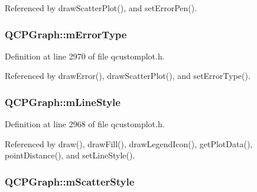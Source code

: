 Referenced by draw\+Scatter\+Plot(), and set\+Error\+Pen().

\hypertarget{class_q_c_p_graph_a29e64273db201aeadebc61c870720a36}{}
\subsubsection[{m\+Error\+Type}]{ Q\+C\+P\+Graph\+::m\+Error\+Type\hspace{0.3cm}{\ttfamily [protected]}}\label{class_q_c_p_graph_a29e64273db201aeadebc61c870720a36}


Definition at line 2970 of file qcustomplot.\+h.



Referenced by draw\+Error(), draw\+Scatter\+Plot(), and set\+Error\+Type().

\hypertarget{class_q_c_p_graph_a8604fd98402035a63375849f7341ee25}{}
\subsubsection[{m\+Line\+Style}]{ Q\+C\+P\+Graph\+::m\+Line\+Style\hspace{0.3cm}{\ttfamily [protected]}}\label{class_q_c_p_graph_a8604fd98402035a63375849f7341ee25}


Definition at line 2968 of file qcustomplot.\+h.



Referenced by draw(), draw\+Fill(), draw\+Legend\+Icon(), get\+Plot\+Data(), point\+Distance(), and set\+Line\+Style().

\hypertarget{class_q_c_p_graph_a4aa36241f166ccd1f75fc8f24e4a3247}{}
\subsubsection[{m\+Scatter\+Style}]{ Q\+C\+P\+Graph\+::m\+Scatter\+Style\hspace{0.3cm}{\ttfamily [protected]}}\label{class_q_c_p_graph_a4aa36241f166ccd1f75fc8f24e4a3247}



